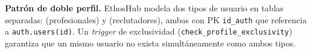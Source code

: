 \begin{NotaTecnica}
\textbf{Patrón de doble perfil.} EthosHub modela dos tipos de usuario en tablas
separadas:  (profesionales) y 
(reclutadores), ambas con PK \texttt{id\_auth} que referencia a \texttt{auth.users(id)}.
Un \textit{trigger} de exclusividad (\texttt{check\_profile\_exclusivity}) garantiza que
un mismo usuario no exista simultáneamente como ambos tipos.
\end{NotaTecnica}







